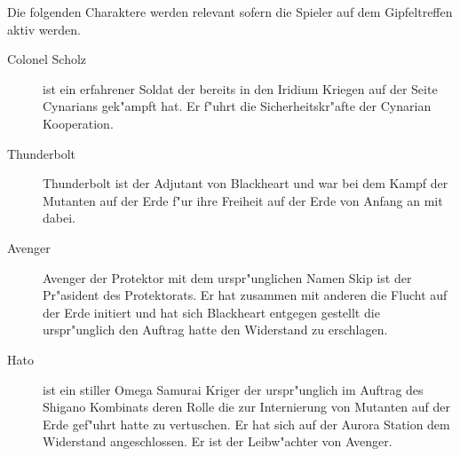 
Die folgenden Charaktere werden relevant sofern die Spieler auf dem Gipfeltreffen aktiv werden.

\begin{description}
    \item[Colonel Scholz] ist ein erfahrener Soldat der bereits in den Iridium Kriegen auf der Seite Cynarians gek"ampft hat. Er f"uhrt 
        die Sicherheitskr"afte der Cynarian Kooperation.
    \item[Thunderbolt] Thunderbolt ist der Adjutant von Blackheart und war bei dem Kampf der Mutanten auf der Erde f"ur ihre Freiheit auf 
        der Erde von Anfang an mit dabei.
    \item[Avenger] Avenger der Protektor mit dem urspr"unglichen Namen Skip ist der Pr"asident des Protektorats. Er hat zusammen mit 
        anderen die Flucht auf der Erde initiert und hat sich Blackheart entgegen gestellt die urspr"unglich den Auftrag hatte den Widerstand zu erschlagen.
    \item[Hato] ist ein stiller Omega Samurai Kriger der urspr"unglich im Auftrag des Shigano Kombinats deren Rolle die zur Internierung 
        von Mutanten auf der Erde gef"uhrt hatte zu vertuschen. Er hat sich auf der Aurora Station dem Widerstand angeschlossen. Er ist der Leibw"achter von Avenger.
\end{description}
\vfill\pagebreak

